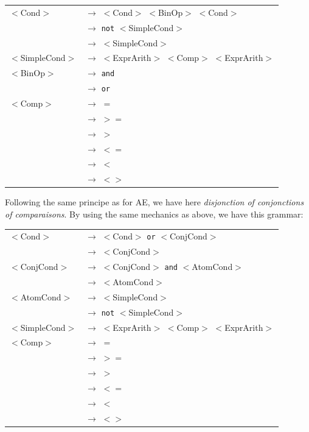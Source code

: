 \documentclass[letterpaper]{article}
\begin{document}
\begin{center}
        \begin{tabular}{l l}
            $<$Cond$>$ & $\rightarrow$ $<$Cond$>$ $<$BinOp$>$ $<$Cond$>$ \\
             & $\rightarrow$ \texttt{not} $<$SimpleCond$>$\\
             & $\rightarrow$ $<$SimpleCond$>$\\
            $<$SimpleCond$>$ & $\rightarrow$
            $<$ExprArith$>$ $<$Comp$>$ $<$ExprArith$>$ \\
            $<$BinOp$>$ & $\rightarrow$ \texttt{and}\\
             & $\rightarrow$ \texttt{or}\\
            $<$Comp$>$ & $\rightarrow$ $=$\\
             & $\rightarrow$ $>=$\\
             & $\rightarrow$ $>$\\
             & $\rightarrow$ $<=$\\
             & $\rightarrow$ $<$\\
             & $\rightarrow$ $<>$\\
        \end{tabular}
\end{center}

Following the same principe as for AE, we have here
\textit{disjonction of conjonctions of comparaisons}. By using the same
mechanics as above, we have this grammar:


\begin{center}
        \begin{tabular}{l l}
            $<$Cond$>$ & $\rightarrow$ $<$Cond$>$ \texttt{or} $<$ConjCond$>$ \\
             & $\rightarrow$ $<$ConjCond$>$\\

            $<$ConjCond$>$ & $\rightarrow$
            $<$ConjCond$>$ \texttt{and} $<$AtomCond$>$\\
             & $\rightarrow$ $<$AtomCond$>$\\

            $<$AtomCond$>$ & $\rightarrow$ $<$SimpleCond$>$\\
             & $\rightarrow$ \texttt{not} $<$SimpleCond$>$\\

            $<$SimpleCond$>$ & $\rightarrow$
            $<$ExprArith$>$ $<$Comp$>$ $<$ExprArith$>$\\

            $<$Comp$>$ & $\rightarrow$ $=$\\
             & $\rightarrow$ $>=$\\
             & $\rightarrow$ $>$\\
             & $\rightarrow$ $<=$\\
             & $\rightarrow$ $<$\\
             & $\rightarrow$ $<>$\\
        \end{tabular}
\end{center}
\end{document}
